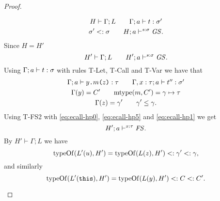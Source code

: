 \begin{proof}
\begin{description}
\begin{description}
          \begin{equation} \label{eq:ecall-hp0}
            \begin{gathered}
              H \vdash \Gamma; L \quad\quad \mbox{$\Gamma;a\vdash t:\sigma'$} \\
              \sigma' <: \sigma \quad\quad H; a \vdash^{s:\sigma} \mathit{GS}.
            \end{gathered}
          \end{equation}
          Since $H = H'$
          \begin{equation} \label{eq:ecall-hp5}
            H' \vdash \Gamma;L \quad\quad H'; a \vdash^{s: \sigma} \mathit{GS}.
          \end{equation}
          Using $\mbox{$\Gamma;a\vdash t:\sigma$}$ with rules {\sc T-Let, T-Call} and
          {\sc T-Var} we have that
          \begin{equation} \label{eq:ecall-hp1}
            \begin{gathered}
              \mbox{$\Gamma;a\vdash\mbox{\mdseries$y$\texttt{.}$m$\texttt{(}$z$\texttt{)}}:\tau$} \quad\quad \mbox{$\Gamma,
              x: \tau;a\vdash t'':\sigma'$} \\
              \Gamma(y) = C' \quad\quad \mbox{$\mathrm{mtype}$}(m, C') = \gamma \mapsto \tau \\
              \Gamma(z) = \gamma' \quad\quad \gamma' \leq \gamma.
            \end{gathered}
          \end{equation}
          Using {\sc T-FS2} with \eqref{eq:ecall-hp0}, \eqref{eq:ecall-hp5} and
          \eqref{eq:ecall-hp1} we get 
          \begin{equation} \label{eq:ecall-hp6}
            H';a \vdash^{x: \tau} \mathit{FS}.
          \end{equation}
          By $H' \vdash \Gamma;L$ we have
          \begin{equation} \label{eq:ecall-hp2}
            \mbox{$\mathrm{typeOf}$}(L'(u), H') = \mbox{$\mathrm{typeOf}$}(L(z), H') <: \gamma' <: \gamma,
          \end{equation}
          and similarly
          \begin{equation} \label{eq:ecall-hp3}
            \mbox{$\mathrm{typeOf}$}(L'(\mbox{\mdseries\texttt{this}}), H') = \mbox{$\mathrm{typeOf}$}(L(y), H') <: C <: C'.
          \end{equation}


\end{description}
\end{description}
\end{proof}
